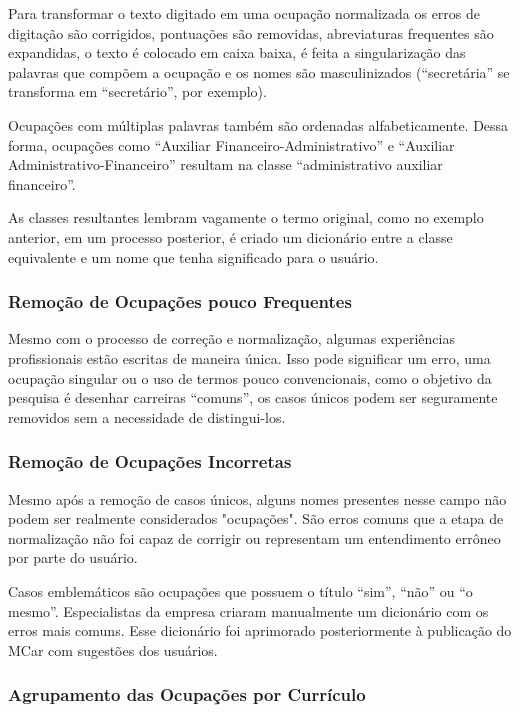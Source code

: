 \documentclass[12pt,a4paper]{article}
\begin{document}
Para transformar o texto digitado em uma ocupação normalizada os erros de digitação são corrigidos, pontuações são removidas, abreviaturas frequentes são expandidas, o texto é colocado em caixa baixa, é feita a singularização das palavras que compõem a ocupação e os nomes são masculinizados (\enquote{secretária} se transforma em \enquote{secretário}, por exemplo).

Ocupações com múltiplas palavras também são ordenadas alfabeticamente. Dessa forma, ocupações como \enquote{Auxiliar Financeiro-Administrativo} e \enquote{Auxiliar Administrativo-Financeiro} resultam na classe \enquote{administrativo auxiliar financeiro}.

As classes resultantes lembram vagamente o termo original, como no exemplo anterior, em um processo posterior, é criado um dicionário entre a classe equivalente e um nome que tenha significado para o usuário.

\subsubsection{Remoção de Ocupações pouco Frequentes}

Mesmo com o processo de correção e normalização, algumas experiências profissionais estão escritas de maneira única. Isso pode significar um erro, uma ocupação singular ou o uso de termos pouco convencionais, como o objetivo da pesquisa é desenhar carreiras \enquote{comuns}, os casos únicos podem ser seguramente removidos sem a necessidade de distingui-los.

\subsubsection{Remoção de Ocupações Incorretas}

Mesmo após a remoção de casos únicos, alguns nomes presentes nesse campo não podem ser realmente considerados "ocupações". São erros comuns que a etapa de normalização não foi capaz de corrigir ou representam um entendimento errôneo por parte do usuário.

Casos emblemáticos são ocupações que possuem o título \enquote{sim}, \enquote{não} ou \enquote{o mesmo}. Especialistas da empresa criaram manualmente um dicionário com os erros mais comuns. Esse dicionário foi aprimorado posteriormente à publicação do MCar com sugestões dos usuários.

\subsubsection{Agrupamento das Ocupações por Currículo}
\end{document}
